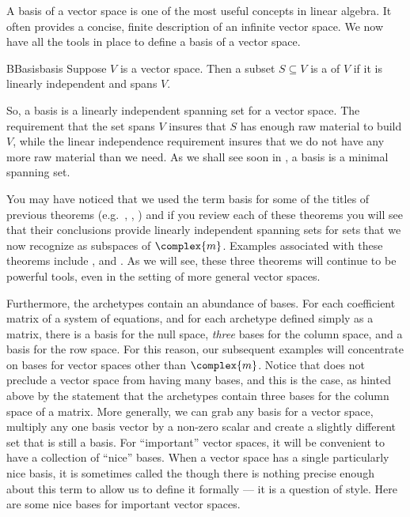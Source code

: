 %
A basis of a vector space is one of the most useful concepts in linear algebra.  It often provides a concise, finite description of an infinite vector space.
%
%
We now have all the tools in place to define a basis of a vector space.
%
%
\begin{definition}{B}{Basis}{basis}
Suppose $V$ is a vector space.  Then a subset $S\subseteq V$ is a  of $V$ if it is linearly independent and spans $V$.
\end{definition}
%
So, a basis is a linearly independent spanning set for a vector space.  The requirement that the set spans $V$ insures that $S$ has enough raw material to build $V$, while the linear independence requirement insures that we do not have any more raw material than we need.  As we shall see soon in , a basis is a minimal spanning set.\par
%
You may have noticed that we used the term basis for some of the titles of previous theorems (e.g.\ , , ) and if you review each of these theorems you will see that their conclusions provide linearly independent spanning sets for sets that we now recognize as subspaces of $\complex{m}$.  Examples associated with these theorems include ,  and .  As we will see, these three theorems will continue to be powerful tools, even in the setting of more general vector spaces.\par
%
Furthermore, the archetypes contain an abundance of bases.  For each coefficient matrix of a system of equations, and for each archetype defined simply as a matrix, there is a basis for the null space, {\em three} bases for the column space, and a basis for the row space.  For this reason, our subsequent examples will concentrate on bases for vector spaces other than $\complex{m}$.
%
Notice that  does not preclude a vector space from having many bases, and this is the case, as hinted above by the statement that the archetypes contain three bases for the column space of a matrix.  More generally, we can grab any basis for a vector space, multiply any one basis vector by a non-zero scalar and create a slightly different set that is still a basis.  For ``important'' vector spaces, it will be convenient to have a collection of ``nice'' bases.  When a vector space has a single particularly nice basis, it is sometimes called the  though there is nothing precise enough about this term to allow us to define it formally --- it is a question of style.  Here are some nice bases for important vector spaces.
